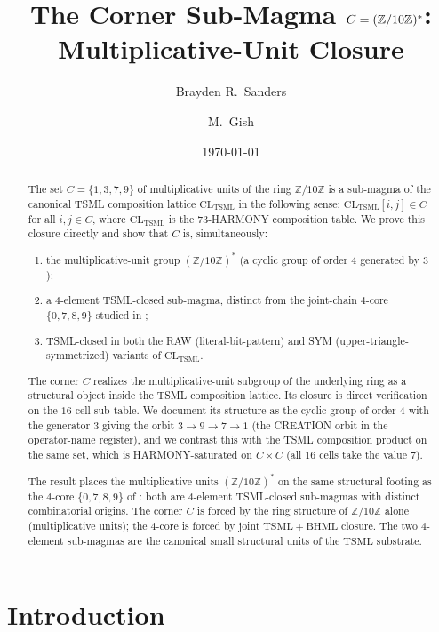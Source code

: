 \documentclass[11pt,reqno]{amsart}
\title[The Corner Sub-Magma]
{The Corner Sub-Magma $C = (\Z/10\Z)^*$: Multiplicative-Unit Closure}
\author{Brayden R.~Sanders}
\author{M.~Gish}
\date{\today}
\theoremstyle{plain}
\theoremstyle{definition}
\theoremstyle{remark}
\newcommand{\Z}{\mathbb{Z}}
\newcommand{\TSML}{\mathrm{TSML}}
\newcommand{\BHML}{\mathrm{BHML}}
\begin{document}
\begin{abstract}
The set $C = \{1, 3, 7, 9\}$ of multiplicative units of the ring
$\Z/10\Z$ is a sub-magma of the canonical TSML composition lattice
$\mathrm{CL}_\TSML$ in the following sense: $\mathrm{CL}_\TSML[i, j] \in C$
for all $i, j \in C$, where $\mathrm{CL}_\TSML$ is the
$73$-HARMONY composition table. We prove this closure directly and
show that $C$ is, simultaneously:
\begin{enumerate}[label={\emph{(\arabic*)}}]
\item the multiplicative-unit group $(\Z/10\Z)^*$ (a cyclic group of
order $4$ generated by $3$);
\item a $4$-element TSML-closed sub-magma, distinct from the joint-chain
$4$-core $\{0, 7, 8, 9\}$ studied in \cite{SandersGishFourCore};
\item TSML-closed in both the RAW (literal-bit-pattern) and SYM
(upper-triangle-symmetrized) variants of $\mathrm{CL}_\TSML$.
\end{enumerate}
The corner $C$ realizes the multiplicative-unit subgroup of the
underlying ring as a structural object inside the TSML composition
lattice. Its closure is direct verification on the $16$-cell sub-table.
We document its structure as the cyclic group of order $4$ with the
generator $3$ giving the orbit $3 \to 9 \to 7 \to 1$ (the CREATION
orbit in the operator-name register), and we contrast this with the
TSML composition product on the same set, which is HARMONY-saturated
on $C \times C$ (all $16$ cells take the value $7$).

The result places the multiplicative units $(\Z/10\Z)^*$ on the
same structural footing as the $4$-core $\{0, 7, 8, 9\}$ of
\cite{SandersGishFourCore}: both are $4$-element TSML-closed sub-magmas
with distinct combinatorial origins. The corner $C$ is forced by the
ring structure of $\Z/10\Z$ alone (multiplicative units); the $4$-core
is forced by joint $\TSML+\BHML$ closure. The two $4$-element
sub-magmas are the canonical small structural units of the $\TSML$
substrate.
\end{abstract}

\maketitle

\tableofcontents

\section{Introduction}
\end{document}
